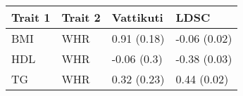 \begin{table}[ht]
\centering
\begin{tabular}{llll}
  \hline
Trait 1 & Trait 2 & Vattikuti & LDSC \\ 
  \hline
BMI & WHR & 0.91 (0.18) & -0.06 (0.02) \\ 
  HDL & WHR & -0.06 (0.3) & -0.38 (0.03) \\ 
  TG & WHR & 0.32 (0.23) & 0.44 (0.02) \\ 
   \hline
\end{tabular}
\end{table}
